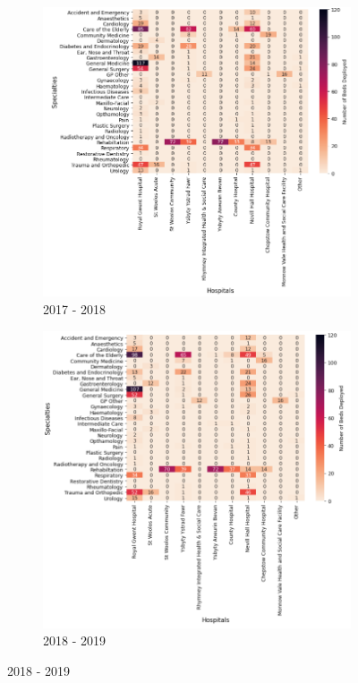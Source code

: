 \documentclass[../thesis.tex]{subfiles}
\begin{document}
\begin{figure}
     \centering
     \begin{subfigure}[h!]{0.8\textwidth}
         \centering
         \includegraphics[width=\textwidth]{Chapters/Chapter5/Figures/2017STOC.png}
         \caption{2017 - 2018}
         \label{fig:stocexp2a}
     \end{subfigure}
\hfill
     \begin{subfigure}{0.8\textwidth}\ContinuedFloat
         \centering
         \includegraphics[width=\textwidth]{Chapters/Chapter5/Figures/2018STOC.png}
         \caption{2018 - 2019}
         \label{fig:stocexp2b}
     \end{subfigure}
     \end{figure}
\end{document}
